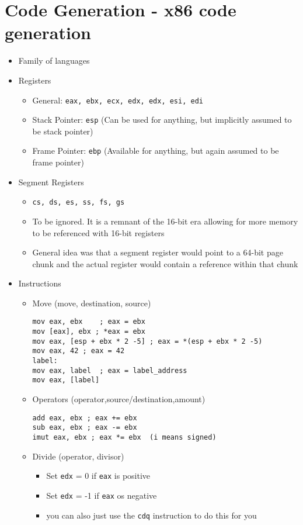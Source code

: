\documentclass{article}
\begin{document}
\section{Code Generation - x86 code generation}
\begin{itemize}
\item Family of languages 
\item Registers 
\begin{itemize}
\item General: \verb|eax, ebx, ecx, edx, edx, esi, edi| 
\item Stack Pointer: \verb|esp| (Can be used for anything, but implicitly assumed to be stack pointer)
\item Frame Pointer: \verb|ebp| (Available for anything, but again assumed to be frame pointer)
\end{itemize}
\item Segment Registers 
\begin{itemize}
\item \verb|cs, ds, es, ss, fs, gs|
\item To be ignored. It is a remnant of the 16-bit era allowing for more memory to be referenced with 16-bit registers
\item General idea was that a segment register would point to a 64-bit page chunk and the actual register would contain a reference within that chunk
\end{itemize}
\item Instructions
\begin{itemize}
\item Move  (move, destination, source)
\begin{lstlisting}
mov eax, ebx    ; eax = ebx 
mov [eax], ebx ; *eax = ebx
mov eax, [esp + ebx * 2 -5] ; eax = *(esp + ebx * 2 -5)
mov eax, 42 ; eax = 42
label: 
mov eax, label  ; eax = label_address 
mov eax, [label]
\end{lstlisting}
\item Operators (operator,source/destination,amount)
\begin{lstlisting}
add eax, ebx ; eax += ebx
sub eax, ebx ; eax -= ebx
imut eax, ebx ; eax *= ebx  (i means signed)
\end{lstlisting}
\item Divide (operator, divisor)
\begin{itemize}
\begin{lstlisting}
idiv ebx; eax = edx:eax / ebx ; edx = edx:eax % ebx 
\end{lstlisting}
\item Set \verb|edx| = 0 if \verb|eax| is positive
\item Set \verb|edx| = -1 if \verb|eax| os negative
\item you can also just use the \verb|cdq| instruction to do this for you
\end{itemize}
\end{itemize}
\end{itemize}
\end{document}
